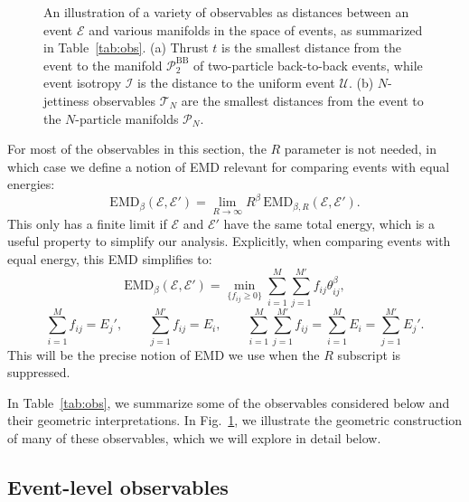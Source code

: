 \documentclass[letterpaper,11pt]{article}
\DeclareRobustCommand{\Tab}[1]{Table~\ref{#1}}
\DeclareRobustCommand{\Fig}[1]{Fig.~\ref{#1}}
\newcommand{\EMD}{\text{EMD}\xspace}
\begin{document}
\begin{figure}[p]
\centering
{}\hspace{4mm}
\caption{\label{fig:space_manyobs} An illustration of a variety of observables as distances between an event $\mathcal E$ and various manifolds in the space of events, as summarized in \Tab{tab:obs}.
%
(a) Thrust $t$ is the smallest distance from the event to the manifold $\mathcal P_2^\text{BB}$ of two-particle back-to-back events, while event isotropy $\mathcal I$ is the distance to the uniform event $\mathcal U$.
%
(b) $N$-jettiness observables $\mathcal T_N$ are the smallest distances from the event to the $N$-particle manifolds $\mathcal P_N$.
}
\end{figure}


For most of the observables in this section, the $R$ parameter is not needed, in which case we define a notion of EMD relevant for comparing events with equal energies:
%
\begin{equation}
\label{eq:emdRtoinfty}
\EMD_{\beta} (\mathcal E, \mathcal E') = \lim_{R \to \infty} R^\beta \, \EMD_{\beta,R} (\mathcal E, \mathcal E').
\end{equation}
%
This only has a finite limit if $\mathcal E$ and $\mathcal E'$ have the same total energy, which is a useful property to simplify our analysis.
%
Explicitly, when comparing events with equal energy, this EMD simplifies to:
\begin{equation}
\label{eq:emd_noR}
\EMD_{\beta} (\mathcal E, \mathcal E') = \min_{\{f_{ij}\ge0\}} \sum_{i=1}^M\sum_{j=1}^{M'} f_{ij} \theta_{ij}^\beta ,
\end{equation}
%
\begin{equation}
\label{eq:emdconstraints_noR}
\sum_{i=1}^M f_{ij} = E_j', \quad\quad \sum_{j=1}^{M'} f_{ij} = E_i, \quad\quad \sum_{i=1}^M\sum_{j=1}^{M'} f_{ij} = \sum_{i=1}^M E_i = \sum_{j=1}^{M'}E_j'.
\end{equation}
%
This will be the precise notion of EMD we use when the $R$ subscript is suppressed.


In \Tab{tab:obs}, we summarize some of the observables considered below and their geometric interpretations.
%
In \Fig{fig:space_manyobs}, we illustrate the geometric construction of many of these observables, which we will explore in detail below.


\subsection{Event-level observables}
\label{sec:eventobservables}
\end{document}
